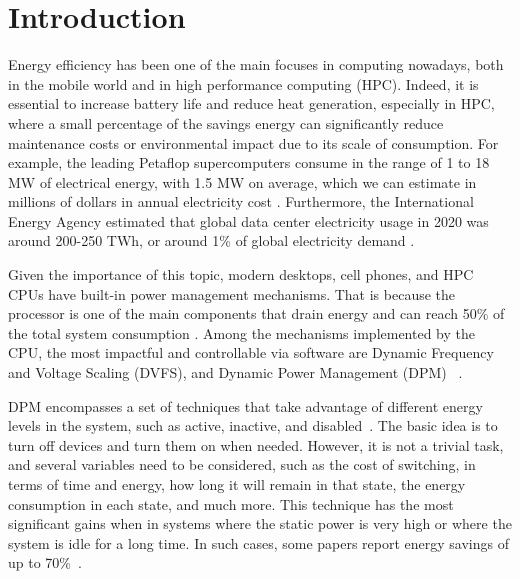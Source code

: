 
\section{Introduction} \label{sec:phases_introduction}

Energy efficiency has been one of the main focuses in computing nowadays, both in the mobile world and in high performance computing (HPC).
Indeed, it is essential to increase battery life and reduce heat generation, especially in HPC, where a small percentage of the savings energy can significantly reduce maintenance costs or environmental impact due to its scale of consumption.
For example, the leading Petaflop supercomputers consume in the range of 1 to 18 MW of electrical energy, with 1.5 MW on average, which we can estimate in millions of dollars in annual electricity cost \cite{Group2012HandbookSahni}. Furthermore, the International Energy Agency \cite{iea_2021} estimated that global data center electricity usage in 2020 was around 200-250 TWh, or around 1\% \cite{Corcoran2017EmergingICT} of global electricity demand  \cite{Mathew2012Energy-awareNetworks}.

Given the importance of this topic, modern desktops, cell phones, and HPC CPUs have built-in power management mechanisms.
That is because the processor is one of the main components that drain energy and can reach 50\% of the total system consumption \cite{Fan2007PowerComputer, Barroso2007TheComputing, Malladi2012TowardsDRAM}. Among the mechanisms implemented by the CPU, the most impactful and controllable via software are Dynamic Frequency and Voltage Scaling (DVFS), and Dynamic Power Management (DPM) ~\cite{Rotem2012Power-managementBridge, Brown2005ACPILinux, Hackenberg2015AnProcessor}.

DPM encompasses a set of techniques that take advantage of different energy levels in the system, such as active, inactive, and disabled~\cite{CARDOSO201717, Shuja2012Energy-efficientCenters, Benini2000AManagement}. The basic idea is to turn off devices and turn them on when needed. However, it is not a trivial task, and several variables need to be considered, such as the cost of switching, in terms of time and energy, how long it will remain in that state, the energy consumption in each state, and much more. This technique has the most significant gains when in systems where the static power is very high or where the system is idle for a long time. In such cases, some papers report energy savings of up to 70\%~\cite{Shuja2012Energy-efficientCenters, Benini2000AManagement}.

